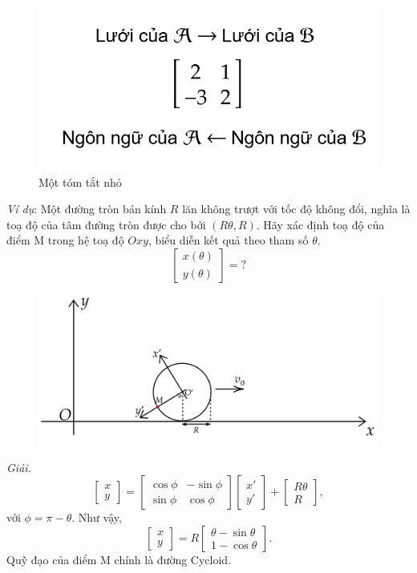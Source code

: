 \begin{figure}[H]
    \centering
    \includegraphics[width=0.4\linewidth]{Tuan2/Figures/final.png}
    \caption{Một tóm tắt nhỏ}
\end{figure}
\emph{Ví dụ}: Một đường tròn bán kính \(R\) lăn không trượt với tốc độ không đổi, nghĩa là toạ độ của tâm đường tròn được cho bởi \((R\theta,R)\). Hãy xác định toạ độ của điểm M trong hệ toạ độ \(Oxy\), biểu diễn kết quả theo tham số \(\theta\).
\[\begin{bmatrix}
    x(\theta)\\y(\theta)
\end{bmatrix}=?\]
\begin{figure}[H]
    \centering
    \includegraphics[width=0.8\linewidth]{Tuan2/Figures/cycloidexample.png}
\end{figure}
\emph{Giải.} 
\[\begin{bmatrix}
    x\\y
\end{bmatrix}=\begin{bmatrix}
    \cos\phi&-\sin\phi \\\sin\phi&\cos\phi
\end{bmatrix}\begin{bmatrix}
    x'\\y'
\end{bmatrix}+\begin{bmatrix}
    R\theta\\R
\end{bmatrix},\] với \(\phi=\pi-\theta.\) Như vậy, 
\[\begin{bmatrix}
    x\\y
\end{bmatrix}=R\begin{bmatrix}
    \theta-\sin\theta\\1-\cos\theta
\end{bmatrix}.\] Quỹ đạo của điểm M chính là đường Cycloid.
